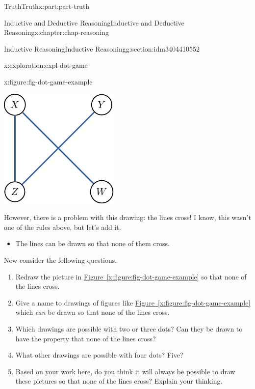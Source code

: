 \documentclass[oneside,10pt,]{book}
\newcommand{\xreffont}{\relax}
\numberwithin{equation}{section}
\begin{document}
\begin{partptx}{Truth}{}{Truth}{}{}{x:part:part-truth}
\begin{chapterptx}{Inductive and Deductive Reasoning}{}{Inductive and Deductive Reasoning}{}{}{x:chapter:chap-reasoning}
\begin{sectionptx}{Inductive Reasoning}{}{Inductive Reasoning}{}{}{g:section:idm3404410552}
\begin{exploration}{}{x:exploration:expl-dot-game}
\begin{figureptx}{}{x:figure:fig-dot-game-example}{}
\begin{image}{0.325}{0.35}{0.325}
\includegraphics[width=\linewidth]{./images/dot-game-example.pdf}
\end{image}%
\tcblower
\end{figureptx}%
However, there is a problem with this drawing: the lines cross! I know, this wasn't one of the rules above, but let's add it.%
%
\begin{itemize}[label=\textbullet]
\item{}The lines can be drawn so that none of them cross.%
\end{itemize}
Now consider the following questions.%
%
\begin{enumerate}
\item{}Redraw the picture in \hyperref[x:figure:fig-dot-game-example]{Figure~{\xreffont\ref{x:figure:fig-dot-game-example}}} so that none of the lines cross.%
\item{}Give a name to drawings of figures like \hyperref[x:figure:fig-dot-game-example]{Figure~{\xreffont\ref{x:figure:fig-dot-game-example}}} which \emph{can} be drawn so that none of the lines cross.%
\item{}Which drawings are possible with two or three dots? Can they be drawn to have the property that none of the lines cross?%
\item{}What other drawings are possible with four dots? Five?%
\item{}Based on your work here, do you think it will always be possible to draw these pictures so that none of the lines cross? Explain your thinking.%

\end{enumerate}
\end{exploration}
\end{sectionptx}
\end{chapterptx}
\end{partptx}
\end{document}
